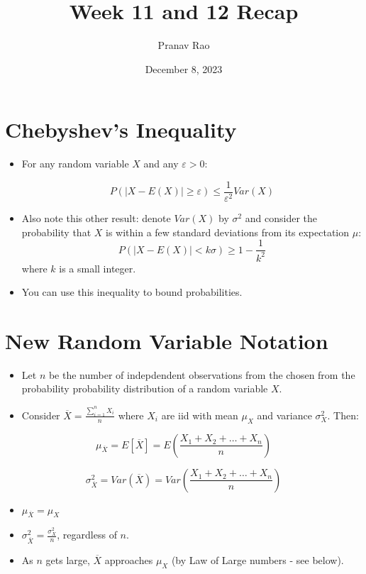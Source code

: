 \documentclass[12pt]{article}
\title{Week 11 and 12 Recap}
\author{Pranav Rao}
\date{December 8, 2023}
\begin{document}
\maketitle

\section{Chebyshev's Inequality}
\begin{itemize}
	\item  For any random variable $X$ and any $\varepsilon > 0$:

	      \[
		      P(\left|X - E(X)\right| \geq \varepsilon) \leq \frac{1}{\varepsilon^2} Var(X)
	      \]
	\item Also note this other result: denote $Var(X)$ by $\sigma^2$ and consider the probability that $X$ is within a few standard deviations from its expectation $\mu$:
	      \[
		      P(\left|X - E(X)\right| < k \sigma) \geq 1 - \frac{1}{k^2}
	      \]
	      where $k$ is a small integer.
	\item You can use this inequality to bound probabilities.
\end{itemize}

\section{New Random Variable Notation}

\begin{itemize}
	\item Let $n$ be the number of indepdendent observations from the
	      chosen from the probability probability distribution of a random
	      variable $X$.
	\item Consider $\overline{X} = \frac{\displaystyle\sum_{i=1}^n X_i}{n}$
	      where $X_i$ are iid with mean $\mu_X$ and variance $\sigma_X^2$. Then:
\end{itemize}

\[
	\mu_{\overline{X}} = E[\overline{X}] = E(\frac{X_1 + X_2 + \ldots + X_n}{n})
\]

\[
	\sigma_{\overline{X}}^2 = Var(\overline{X}) = Var(\frac{X_1 + X_2 + \ldots + X_n}{n})
\]

\begin{itemize}
	\item $\mu_{\overline{X}} = \mu_X$
	\item $\sigma^2_{\overline{X}} = \frac{\sigma_X^2}{n}$, regardless of $n$.
	\item  As $n$ gets large, $\overline{X}$ approaches $\mu_X$ (by Law of Large
	      numbers - see below).
\end{itemize}
\end{document}
